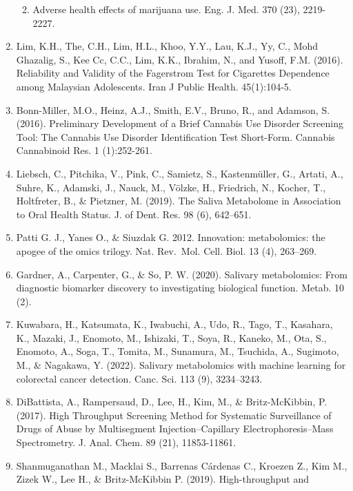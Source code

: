 \documentclass[journal=jacsat,manuscript=article]{achemso}
\providecommand{\tightlist}{%
  \setlength{\itemsep}{0pt}\setlength{\parskip}{0pt}}
\begin{document}
\begin{enumerate}
  \begin{enumerate}
  \def\labelenumii{(\arabic{enumii})}
  \setcounter{enumii}{2013}
  \tightlist
  \item
    Adverse health effects of marijuana use. Eng. J. Med. 370 (23),
    2219-2227.
  \end{enumerate}
\item
  Lim, K.H., The, C.H., Lim, H.L., Khoo, Y.Y., Lau, K.J., Yy, C., Mohd
  Ghazalig, S., Kee Cc, C.C., Lim, K.K., Ibrahim, N., and Yusoff, F.M.
  (2016). Reliability and Validity of the Fagerstrom Test for Cigarettes
  Dependence among Malaysian Adolescents. Iran J Public Health.
  45(1):104-5.
\item
  Bonn-Miller, M.O., Heinz, A.J., Smith, E.V., Bruno, R., and Adamson,
  S. (2016). Preliminary Development of a Brief Cannabis Use Disorder
  Screening Tool: The Cannabis Use Disorder Identification Test
  Short-Form. Cannabis Cannabinoid Res. 1 (1):252-261.
\item
  Liebsch, C., Pitchika, V., Pink, C., Samietz, S., Kastenmüller, G.,
  Artati, A., Suhre, K., Adamski, J., Nauck, M., Völzke, H., Friedrich,
  N., Kocher, T., Holtfreter, B., \& Pietzner, M. (2019). The Saliva
  Metabolome in Association to Oral Health Status. J. of Dent. Res. 98
  (6), 642--651.
\item
  Patti G. J., Yanes O., \& Siuzdak G. 2012. Innovation: metabolomics:
  the apogee of the omics trilogy. Nat. Rev.~Mol. Cell. Biol. 13 (4),
  263--269.
\item
  Gardner, A., Carpenter, G., \& So, P. W. (2020). Salivary
  metabolomics: From diagnostic biomarker discovery to investigating
  biological function. Metab. 10 (2).
\item
  Kuwabara, H., Katsumata, K., Iwabuchi, A., Udo, R., Tago, T.,
  Kasahara, K., Mazaki, J., Enomoto, M., Ishizaki, T., Soya, R., Kaneko,
  M., Ota, S., Enomoto, A., Soga, T., Tomita, M., Sunamura, M.,
  Tsuchida, A., Sugimoto, M., \& Nagakawa, Y. (2022). Salivary
  metabolomics with machine learning for colorectal cancer detection.
  Canc. Sci. 113 (9), 3234--3243.
\item
  DiBattista, A., Rampersaud, D., Lee, H., Kim, M., \& Britz-McKibbin,
  P. (2017). High Throughput Screening Method for Systematic
  Surveillance of Drugs of Abuse by Multisegment Injection--Capillary
  Electrophoresis--Mass Spectrometry. J. Anal. Chem. 89 (21),
  11853-11861.
\item
  Shanmuganathan M., Macklai S., Barrenas Cárdenas C., Kroezen Z., Kim
  M., Zizek W., Lee H., \& Britz-McKibbin P. (2019). High-throughput and

\end{enumerate}
\end{document}
